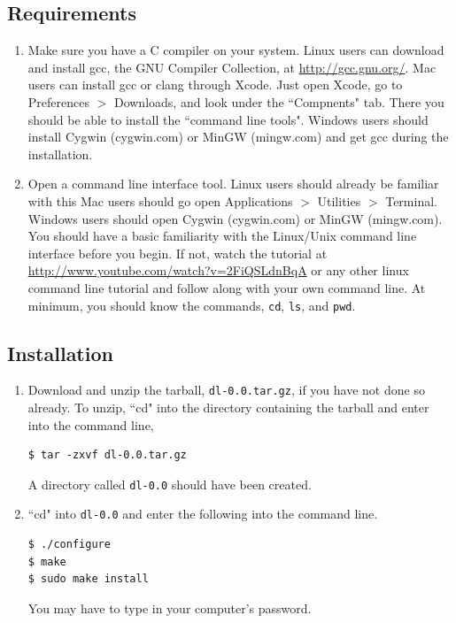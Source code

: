 \documentclass{article}
\begin{document}
\begin{flushleft}
\subsection{Requirements}
\begin{enumerate}
\item Make sure you have a C compiler on your system. Linux users can download and install gcc, the GNU Compiler Collection, at \url{http://gcc.gnu.org/}. Mac users can install gcc or clang through Xcode. Just open Xcode, go to Preferences $>$ Downloads, and look under the ``Compnents" tab. There you should be able to install the ``command line tools". Windows users should install Cygwin (cygwin.com) or MinGW (mingw.com) and get gcc during the installation.
\item Open a command line interface tool. Linux users should already be familiar with this Mac users should go open Applications $>$ Utilities $>$ Terminal. Windows users should open Cygwin (cygwin.com) or MinGW (mingw.com). You should have a basic familiarity with the Linux/Unix command line interface before you begin. If not, watch the tutorial at \url{http://www.youtube.com/watch?v=2FiQSLdnBqA} or any other linux command line tutorial and follow along with your own command line. At minimum, you should know the commands, {\tt cd}, {\tt ls}, and {\tt pwd}.
\end{enumerate}


\subsection{Installation}
\begin{enumerate}
\item Download and unzip the tarball, {\tt dl-0.0.tar.gz}, if you have not done so already. To unzip, ``cd" into the directory containing the tarball and enter into the command line,

\begin{lstlisting}
$ tar -zxvf dl-0.0.tar.gz
\end{lstlisting}

A directory called {\tt dl-0.0} should have been created.

\item ``cd" into {\tt dl-0.0} and enter the following into the command line.

\begin{lstlisting}
$ ./configure
$ make
$ sudo make install
\end{lstlisting}

You may have to type in your computer's password.
\end{enumerate}


\end{flushleft}
\end{document}
